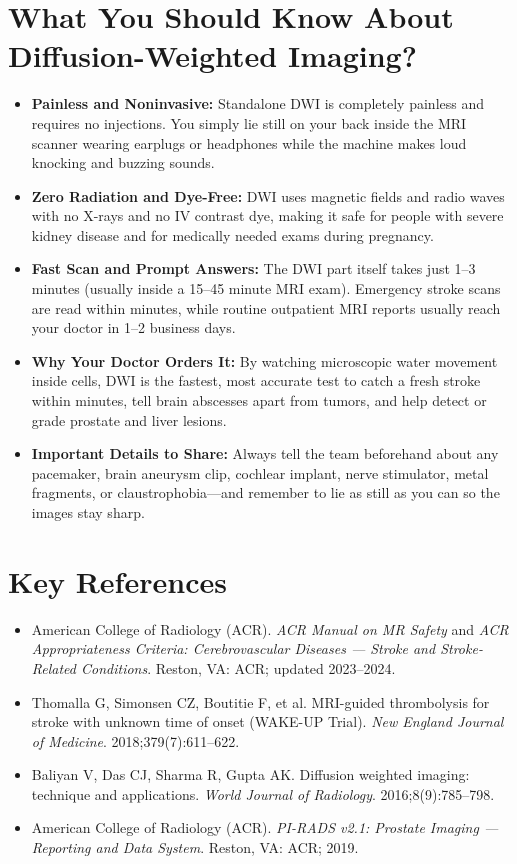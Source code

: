 \section{What You Should Know About Diffusion-Weighted Imaging?}
\begin{itemize}
\item \textbf{Painless and Noninvasive:} Standalone DWI is completely painless and requires no injections. You simply lie still on your back inside the MRI scanner wearing earplugs or headphones while the machine makes loud knocking and buzzing sounds.
\item \textbf{Zero Radiation and Dye-Free:} DWI uses magnetic fields and radio waves with no X-rays and no IV contrast dye, making it safe for people with severe kidney disease and for medically needed exams during pregnancy.
\item \textbf{Fast Scan and Prompt Answers:} The DWI part itself takes just 1--3 minutes (usually inside a 15--45 minute MRI exam). Emergency stroke scans are read within minutes, while routine outpatient MRI reports usually reach your doctor in 1--2 business days.
\item \textbf{Why Your Doctor Orders It:} By watching microscopic water movement inside cells, DWI is the fastest, most accurate test to catch a fresh stroke within minutes, tell brain abscesses apart from tumors, and help detect or grade prostate and liver lesions.
\item \textbf{Important Details to Share:} Always tell the team beforehand about any pacemaker, brain aneurysm clip, cochlear implant, nerve stimulator, metal fragments, or claustrophobia---and remember to lie as still as you can so the images stay sharp.
\end{itemize}

\section{Key References}
\begin{itemize}
\item American College of Radiology (ACR). \textit{ACR Manual on MR Safety} and \textit{ACR Appropriateness Criteria: Cerebrovascular Diseases --- Stroke and Stroke-Related Conditions}. Reston, VA: ACR; updated 2023--2024.
\item Thomalla G, Simonsen CZ, Boutitie F, et al. MRI-guided thrombolysis for stroke with unknown time of onset (WAKE-UP Trial). \textit{New England Journal of Medicine}. 2018;379(7):611--622.
\item Baliyan V, Das CJ, Sharma R, Gupta AK. Diffusion weighted imaging: technique and applications. \textit{World Journal of Radiology}. 2016;8(9):785--798.
\item American College of Radiology (ACR). \textit{PI-RADS v2.1: Prostate Imaging --- Reporting and Data System}. Reston, VA: ACR; 2019.
\end{itemize}
